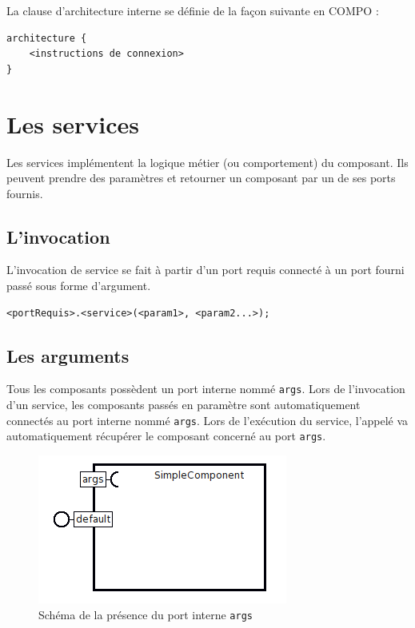 \documentclass[11pt,a4paper,openany,oneside]{book}
\begin{document}
La clause d'architecture interne se définie de la façon suivante en COMPO : 

\begin{lstlisting}[language=Compo, caption=Syntaxe de la définition d'une clause architecture, frame=single]
architecture {
    <instructions de connexion>
}
\end{lstlisting}

\section{Les services}

Les services implémentent la logique métier (ou comportement) du composant. Ils peuvent prendre des paramètres et retourner un composant par un de ses ports fournis.

\subsection{L'invocation}

L'invocation de service se fait à partir d'un port requis connecté à un port fourni passé sous forme d'argument.
\begin{lstlisting}[frame=single, caption=Syntaxe de l'invocation de service]
<portRequis>.<service>(<param1>, <param2...>);
\end{lstlisting}

\subsection{Les arguments}

Tous les composants possèdent un port interne nommé \texttt{args}. Lors de l'invocation d'un service, les composants passés en paramètre sont automatiquement connectés au port interne nommé \texttt{args}. Lors de l'exécution du service, l'appelé va automatiquement récupérer le composant concerné au port \texttt{args}.

\begin{figure}[H]
\centering
\includegraphics[scale=0.7, keepaspectratio=true]{portargs}
\caption{Schéma de la présence du port interne \texttt{args}}
\label{args}
\end{figure}
\end{document}
